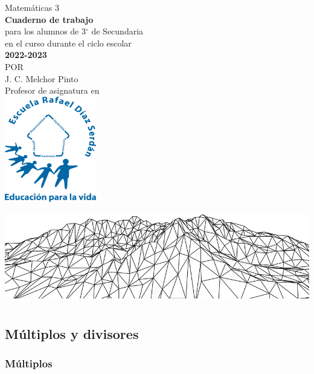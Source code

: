 \documentclass[11pt]{book}
\begin{document}
\pagestyle{empty}
\begin{center}
  {\Huge Matem\'aticas 3}\\
  \vspace{2cm}
  \normalsize
  \textbf{\large Cuaderno de trabajo}\\
  para los alumnos de 3$^\circ$ de  Secundaria\\
  en el curso durante el ciclo escolar\\
  \textbf{2022-2023}\\
  \vspace{2.5cm}
  \small POR\\
  \Large J. C. Melchor Pinto\\[0.5em]
  \normalsize Profesor de asignatura en\\
  \vspace{1cm}
  \includegraphics[width=4cm]{./Unidad 2/Images/LOGO_RDS_nobg}
\end{center}
\vspace{2cm}
%
\hspace{-16mm}
\includegraphics[width=\paperwidth]{./Unidad 2/Images/cover_bg}
\restoregeometry
\tableofcontents
\chapter{}

\section{Múltiplos y divisores}
\subsection{Múltiplos}
\end{document}
